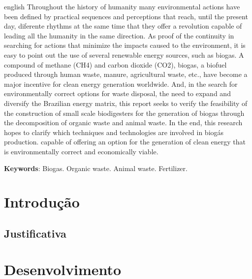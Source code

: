 \documentclass[
	12pt,
	oneside,
	a4paper,
	chapter=TITLE,
	english,
	brazil,
	hidelinks
]{abntex2}
\begin{document}
\begin{resumo}[Abstract]\vspace*{-1.1cm}
\begin{otherlanguage*}{english}\SingleSpacing
Throughout the history of humanity many environmental actions have been defined by practical sequences and perceptions that reach, until the present day, diferente rhythms at the same time that they offer a revolution capable of leading all the humanity in the same direction. As proof of the continuity in searching for actions that minimize the impacts caused to the environment, it is easy to point out the use of several renewable energy sources, such as biogas. A compound of methane (CH4) and carbon dioxide (CO2), biogas, a biofuel produced through human waste, manure, agricultural waste, etc., have become a major incentive for clean energy generation worldwide. And, in the search for environmentally correct options for waste disposal, the need to expand and diversify the Brazilian energy matrix, this report seeks to verify the feasibility of the construction of small scale biodigesters for the generation of biogas through the decomposition of organic waste and animal waste. In the end, this research hopes to clarify which techniques and technologies are involved in biogás production. capable of offering an option for the generation of clean energy that is environmentally correct and economically viable.

\textbf{Keywords}: Biogas. Organic waste. Animal waste. Fertilizer.
\end{otherlanguage*}
\end{resumo}

\tableofcontents*
\cleardoublepage

\textual

\pagestyle{simple}

\chapter{Introdução}

\blindtext

\section{Justificativa}

\Blindtext

\chapter{Desenvolvimento}
\end{document}
